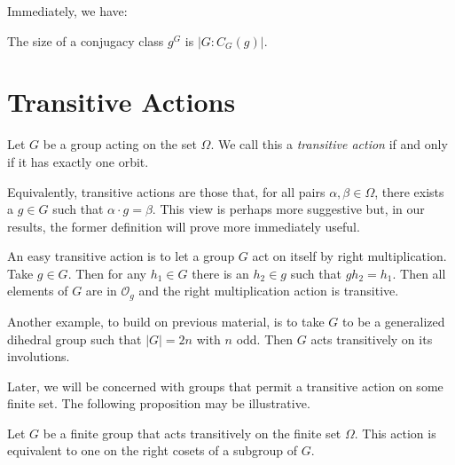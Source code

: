 \documentclass[main.tex]{subfiles}
\begin{document}
Immediately, we have:

\begin{corollary}
The size of a conjugacy class $g^G$ is $|G : C_G(g)|$.
\end{corollary}

\hss

\section{Transitive Actions}

\hss

\begin{definition}
Let $G$ be a group acting on the set $\Omega$. We call this a \emph{transitive action} if and only if it has exactly one orbit.
\end{definition}

\hss

Equivalently, transitive actions are those that, for all pairs $\alpha, \beta \in \Omega$, there exists a $g \in G$ such that $ \alpha \cdot g = \beta$. This view is perhaps more suggestive but, in our results, the former definition will prove more immediately useful.

An easy transitive action is to let a group $G$ act on itself by right multiplication. Take $g \in G$. Then for any $h_1 \in G$ there is an $h_2 \in g$ such that $g h_2 = h_1$. Then all elements of $G$ are in $\mathcal{O}_g$ and the right multiplication action is transitive.

Another example, to build on previous material, is to take $G$ to be a generalized dihedral group such that $|G| = 2n$ with $n$ odd. Then $G$ acts transitively on its involutions.

\hss

Later, we will be concerned with groups that permit a transitive action on some finite set. The following proposition may be illustrative.

\begin{theorem}\label{transitivegroup}
Let $G$ be a finite group that acts transitively on the finite set $\Omega$. This action is equivalent to one on the right cosets of a subgroup of $G$.
\end{theorem}
\end{document}
